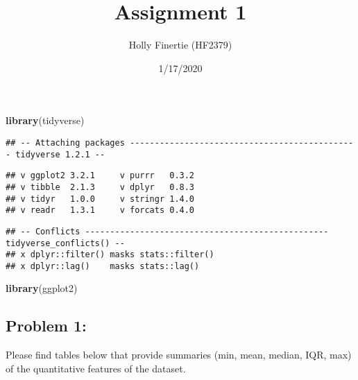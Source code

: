 \documentclass[]{article}
\title{Assignment 1}
\author{Holly Finertie (HF2379)}
\date{1/17/2020}
\newenvironment{Shaded}{\begin{snugshade}}{\end{snugshade}}
\newcommand{\KeywordTok}[1]{\textcolor[rgb]{0.13,0.29,0.53}{\textbf{#1}}}
\newcommand{\NormalTok}[1]{#1}
\newcommand{\OperatorTok}[1]{\textcolor[rgb]{0.81,0.36,0.00}{\textbf{#1}}}
\newcommand{\StringTok}[1]{\textcolor[rgb]{0.31,0.60,0.02}{#1}}
\begin{document}
\maketitle

\begin{Shaded}
\begin{Highlighting}[]
\KeywordTok{library}\NormalTok{(tidyverse)}
\end{Highlighting}
\end{Shaded}

\begin{verbatim}
## -- Attaching packages ---------------------------------------------- tidyverse 1.2.1 --
\end{verbatim}

\begin{verbatim}
## v ggplot2 3.2.1     v purrr   0.3.2
## v tibble  2.1.3     v dplyr   0.8.3
## v tidyr   1.0.0     v stringr 1.4.0
## v readr   1.3.1     v forcats 0.4.0
\end{verbatim}

\begin{verbatim}
## -- Conflicts ------------------------------------------------- tidyverse_conflicts() --
## x dplyr::filter() masks stats::filter()
## x dplyr::lag()    masks stats::lag()
\end{verbatim}

\begin{Shaded}
\begin{Highlighting}[]
\KeywordTok{library}\NormalTok{(ggplot2)}
\end{Highlighting}
\end{Shaded}

\hypertarget{problem-1}{%
\subsection{Problem 1:}\label{problem-1}}

Please find tables below that provide summaries (min, mean, median, IQR,
max) of the quantitative features of the dataset.

\begin{Shaded}
\end{Shaded}
\end{document}
